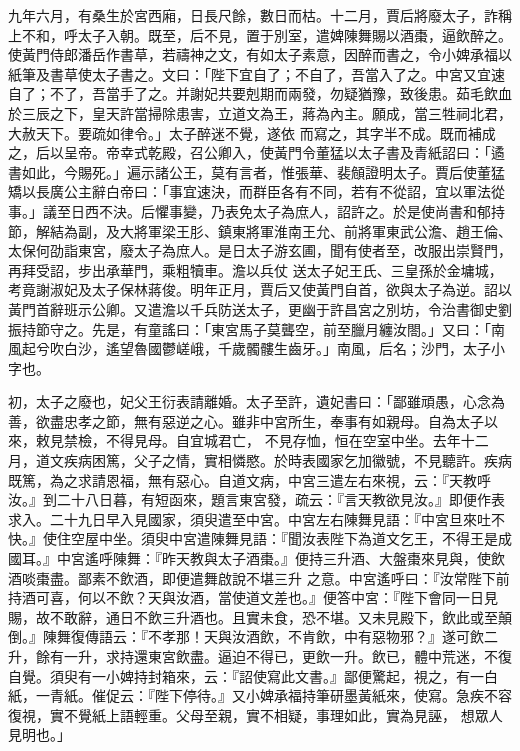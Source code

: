 \begin{pinyinscope}
 九年六月，有桑生於宮西廂，日長尺餘，數日而枯。十二月，賈后將廢太子，詐稱上不和，呼太子入朝。既至，后不見，置于別室，遣婢陳舞賜以酒棗，逼飲醉之。使黃門侍郎潘岳作書草，若禱神之文，有如太子素意，因醉而書之，令小婢承福以紙筆及書草使太子書之。文曰：「陛下宜自了；不自了，吾當入了之。中宮又宜速自了；不了，吾當手了之。并謝妃共要剋期而兩發，勿疑猶豫，致後患。茹毛飲血於三辰之下，皇天許當掃除患害，立道文為王，蔣為內主。願成，當三牲祠北君，大赦天下。要疏如律令。」太子醉迷不覺，遂依
 而寫之，其字半不成。既而補成之，后以呈帝。帝幸式乾殿，召公卿入，使黃門令董猛以太子書及青紙詔曰：「遹書如此，今賜死。」遍示諸公王，莫有言者，惟張華、裴頠證明太子。賈后使董猛矯以長廣公主辭白帝曰：「事宜速決，而群臣各有不同，若有不從詔，宜以軍法從事。」議至日西不決。后懼事變，乃表免太子為庶人，詔許之。於是使尚書和郁持節，解結為副，及大將軍梁王肜、鎮東將軍淮南王允、前將軍東武公澹、趙王倫、太保何劭詣東宮，廢太子為庶人。是日太子游玄圃，聞有使者至，改服出崇賢門，再拜受詔，步出承華門，乘粗犢車。澹以兵仗
 送太子妃王氏、三皇孫於金墉城，考竟謝淑妃及太子保林蔣俊。明年正月，賈后又使黃門自首，欲與太子為逆。詔以黃門首辭班示公卿。又遣澹以千兵防送太子，更幽于許昌宮之別坊，令治書御史劉振持節守之。先是，有童謠曰：「東宮馬子莫聾空，前至臘月纏汝閤。」又曰：「南風起兮吹白沙，遙望魯國鬱嵯峨，千歲髑髏生齒牙。」南風，后名；沙門，太子小字也。



 初，太子之廢也，妃父王衍表請離婚。太子至許，遺妃書曰：「鄙雖頑愚，心念為善，欲盡忠孝之節，無有惡逆之心。雖非中宮所生，奉事有如親母。自為太子以來，敕見禁檢，不得見母。自宜城君亡，
 不見存恤，恒在空室中坐。去年十二月，道文疾病困篤，父子之情，實相憐愍。於時表國家乞加徽號，不見聽許。疾病既篤，為之求請恩福，無有惡心。自道文病，中宮三遣左右來視，云：『天教呼汝。』到二十八日暮，有短函來，題言東宮發，疏云：『言天教欲見汝。』即便作表求入。二十九日早入見國家，須臾遣至中宮。中宮左右陳舞見語：『中宮旦來吐不快。』使住空屋中坐。須臾中宮遣陳舞見語：『聞汝表陛下為道文乞王，不得王是成國耳。』中宮遙呼陳舞：『昨天教與太子酒棗。』便持三升酒、大盤棗來見與，使飲酒啖棗盡。鄙素不飲酒，即便遣舞啟說不堪三升
 之意。中宮遙呼曰：『汝常陛下前持酒可喜，何以不飲？天與汝酒，當使道文差也。』便答中宮：『陛下會同一日見賜，故不敢辭，通日不飲三升酒也。且實未食，恐不堪。又未見殿下，飲此或至顛倒。』陳舞復傳語云：『不孝那！天與汝酒飲，不肯飲，中有惡物邪？』遂可飲二升，餘有一升，求持還東宮飲盡。逼迫不得已，更飲一升。飲已，體中荒迷，不復自覺。須臾有一小婢持封箱來，云：『詔使寫此文書。』鄙便驚起，視之，有一白紙，一青紙。催促云：『陛下停待。』又小婢承福持筆研墨黃紙來，使寫。急疾不容復視，實不覺紙上語輕重。父母至親，實不相疑，事理如此，實為見誣，
 想眾人見明也。」




\end{pinyinscope}

